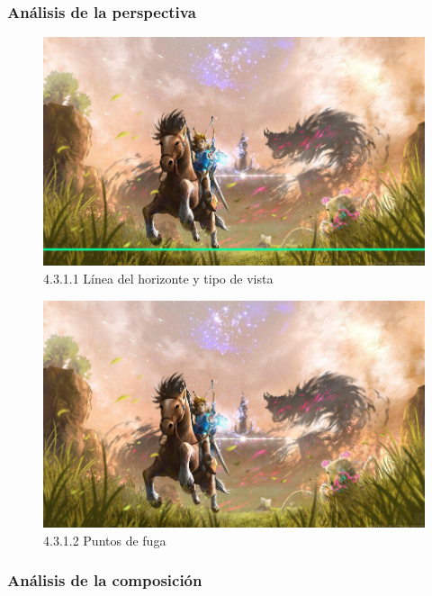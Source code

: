 \documentclass[12pt]{article}
\begin{document}
    
        \subsubsection{Análisis de la perspectiva}


    \begin{figure}[H]
      \centering
      \includegraphics[scale=0.7]{images/Saúl/Sección 17/EA_img17_1Perspectiva_1LineaTierra-TipoVista.png}
      \caption{\small 4.3.1.1 Línea del horizonte y tipo de vista}
    \end{figure}



    \begin{figure}[H]
      \centering
      \includegraphics[scale=0.7]{images/Saúl/Sección 17/EA_img17_1Perspectiva_2PuntosFuga.png}
      \caption{\small 4.3.1.2 Puntos de fuga}
    \end{figure}




        \subsubsection{Análisis de la composición}
\end{document}
